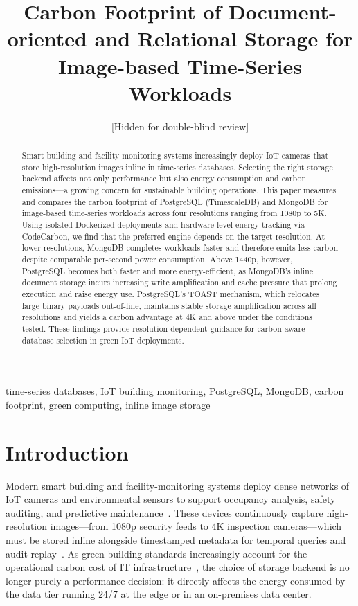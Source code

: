\documentclass[conference]{IEEEtran}
\begin{document}
\title{Carbon Footprint of Document-oriented and Relational Storage for Image-based Time-Series Workloads}

\author{
[Hidden for double-blind review]
}


\maketitle

\begin{abstract}
Smart building and facility-monitoring systems increasingly deploy IoT cameras that store high-resolution images inline in time-series databases. Selecting the right storage backend affects not only performance but also energy consumption and carbon emissions---a growing concern for sustainable building operations. This paper measures and compares the carbon footprint of PostgreSQL (TimescaleDB) and MongoDB for image-based time-series workloads across four resolutions ranging from 1080p to 5K. Using isolated Dockerized deployments and hardware-level energy tracking via CodeCarbon, we find that the preferred engine depends on the target resolution. At lower resolutions, MongoDB completes workloads faster and therefore emits less carbon despite comparable per-second power consumption. Above 1440p, however, PostgreSQL becomes both faster and more energy-efficient, as MongoDB's inline document storage incurs increasing write amplification and cache pressure that prolong execution and raise energy use. PostgreSQL's TOAST mechanism, which relocates large binary payloads out-of-line, maintains stable storage amplification across all resolutions and yields a carbon advantage at 4K and above under the conditions tested. These findings provide resolution-dependent guidance for carbon-aware database selection in green IoT deployments.
\end{abstract}

\begin{IEEEkeywords}
time-series databases, IoT building monitoring, PostgreSQL, MongoDB, carbon footprint, green computing, inline image storage
\end{IEEEkeywords}

\section{Introduction}
\label{sec:introduction}

Modern smart building and facility-monitoring systems deploy dense networks of IoT cameras and environmental sensors to support occupancy analysis, safety auditing, and predictive maintenance~\cite{bajera_iot_smart_buildings,alfuqaha_iot_survey}. These devices continuously capture high-resolution images---from 1080p security feeds to 4K inspection cameras---which must be stored inline alongside timestamped metadata for temporal queries and audit replay~\cite{ceec_tsdb_review,jensen_tsms_survey}. As green building standards increasingly account for the operational carbon cost of IT infrastructure~\cite{nerc_tsdb_survey}, the choice of storage backend is no longer purely a performance decision: it directly affects the energy consumed by the data tier running 24/7 at the edge or in an on-premises data center.
\end{document}
